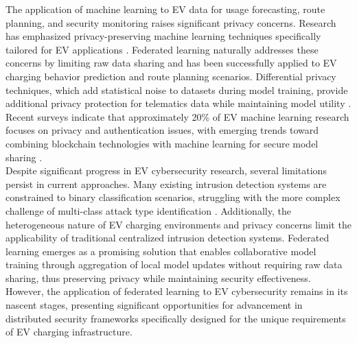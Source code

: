 The application of machine learning to EV data for usage forecasting, route planning, and security monitoring raises significant privacy concerns. Research has emphasized privacy-preserving machine learning techniques specifically tailored for EV applications \cite{mousaei2024advancing}. Federated learning naturally addresses these concerns by limiting raw data sharing and has been successfully applied to EV charging behavior prediction and route planning scenarios. Differential privacy techniques, which add statistical noise to datasets during model training, provide additional privacy protection for telematics data while maintaining model utility \cite{mazhar2023electric}. Recent surveys indicate that approximately 20\% of EV machine learning research focuses on privacy and authentication issues, with emerging trends toward combining blockchain technologies with machine learning for secure model sharing \cite{khan2023blockchain}. \\

Despite significant progress in EV cybersecurity research, several limitations persist in current approaches. Many existing intrusion detection systems are constrained to binary classification scenarios, struggling with the more complex challenge of multi-class attack type identification \cite{naeem2025optimizing}. Additionally, the heterogeneous nature of EV charging environments and privacy concerns limit the applicability of traditional centralized intrusion detection systems. Federated learning emerges as a promising solution that enables collaborative model training through aggregation of local model updates without requiring raw data sharing, thus preserving privacy while maintaining security effectiveness. However, the application of federated learning to EV cybersecurity remains in its nascent stages, presenting significant opportunities for advancement in distributed security frameworks specifically designed for the unique requirements of EV charging infrastructure.


